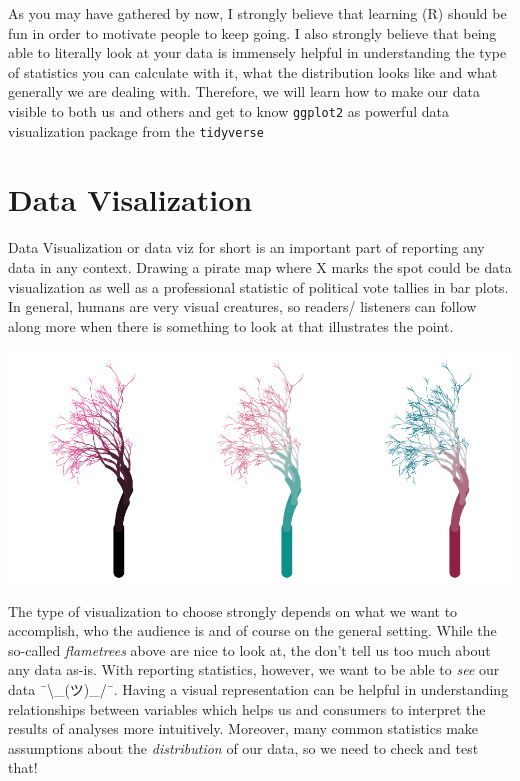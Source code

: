 \documentclass[
]{book}
\begin{document}
As you may have gathered by now, I strongly believe that learning (R) should be fun in order to motivate people to keep going.
I also strongly believe that being able to literally look at your data is immensely helpful in understanding the type of statistics you can calculate with it, what the distribution looks like and what generally we are dealing with.
Therefore, we will learn how to make our data visible to both us and others and get to know \texttt{ggplot2} as powerful data visualization package from the \texttt{tidyverse}

\section{\texorpdfstring{Data Visalization }{Data Visalization }}\label{data-visalization}

Data Visualization or data viz for short is an important part of reporting any data in any context.
Drawing a pirate map where X marks the spot could be data visualization as well as a professional statistic of political vote tallies in bar plots.
In general, humans are very visual creatures, so readers/ listeners can follow along more when there is something to look at that illustrates the point.

\includegraphics{_main_files/figure-html/flametrees-1.pdf}

The type of visualization to choose strongly depends on what we want to accomplish, who the audience is and of course on the general setting.
While the so-called \emph{flametrees} above are nice to look at, the don't tell us too much about any data as-is.
With reporting statistics, however, we want to be able to \emph{see} our data ¯\textbackslash\_(ツ)\_/¯.
Having a visual representation can be helpful in understanding relationships between variables which helps us and consumers to interpret the results of analyses more intuitively.
Moreover, many common statistics make assumptions about the \emph{distribution} of our data, so we need to check and test that!
\end{document}
